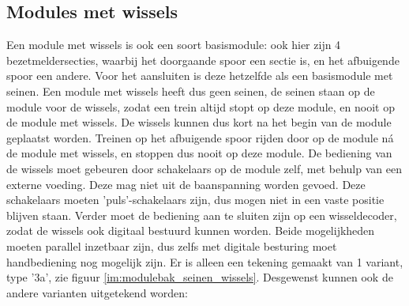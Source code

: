 \documentclass[12pt,a4paper]{report}
\begin{document}
\subsection{Modules met wissels}
Een module met wissels is ook een soort basismodule: ook hier zijn 4 bezetmeldersecties, waarbij het doorgaande spoor een sectie is, en het afbuigende spoor een andere. Voor het aansluiten is deze hetzelfde als een basismodule met seinen.
Een module met wissels heeft dus geen seinen, de seinen staan op de module voor de wissels, zodat een trein altijd stopt op deze module, en nooit op de module met wissels. De wissels kunnen dus kort na het begin van de module geplaatst worden.
Treinen op het afbuigende spoor rijden door op de module n\'{a} de module met wissels, en stoppen dus nooit op deze module.
De bediening van de wissels moet gebeuren door schakelaars op de module zelf, met behulp van een externe voeding. Deze mag niet uit de baanspanning worden gevoed. Deze schakelaars moeten 'puls'-schakelaars zijn, dus mogen niet in een vaste positie blijven staan.
Verder moet de bediening aan te sluiten zijn op een wisseldecoder, zodat de wissels ook digitaal bestuurd kunnen worden. Beide mogelijkheden moeten parallel inzetbaar zijn, dus zelfs met digitale besturing moet handbediening nog mogelijk zijn.
Er is alleen een tekening gemaakt van 1 variant, type '3a', zie figuur \ref{im:modulebak_seinen_wissels}. Desgewenst kunnen ook de andere varianten uitgetekend worden:
\end{document}
